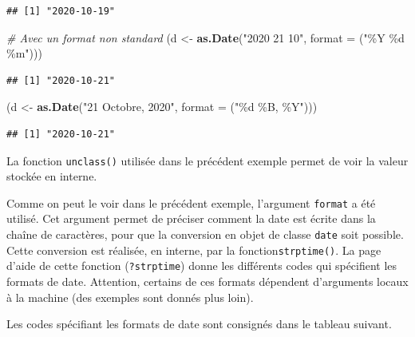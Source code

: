 \documentclass[
  11pt,
]{book}
\newenvironment{Shaded}{\begin{snugshade}}{\end{snugshade}}
\newcommand{\CommentTok}[1]{\textcolor[rgb]{0.56,0.35,0.01}{\textit{#1}}}
\newcommand{\DataTypeTok}[1]{\textcolor[rgb]{0.13,0.29,0.53}{#1}}
\newcommand{\KeywordTok}[1]{\textcolor[rgb]{0.13,0.29,0.53}{\textbf{#1}}}
\newcommand{\NormalTok}[1]{#1}
\newcommand{\StringTok}[1]{\textcolor[rgb]{0.31,0.60,0.02}{#1}}
\numberwithin{equation}{section}
\numberwithin{countremarque}{section}
\begin{document}
\begin{lstlisting}
## [1] "2020-10-19"
\end{lstlisting}

\begin{Shaded}
\begin{Highlighting}[]
\CommentTok{\# Avec un format non standard}
\NormalTok{(d \textless{}{-}}\StringTok{ }\KeywordTok{as.Date}\NormalTok{(}\StringTok{"2020 21 10"}\NormalTok{, }\DataTypeTok{format =}\NormalTok{ (}\StringTok{"\%Y \%d \%m"}\NormalTok{)))}
\end{Highlighting}
\end{Shaded}

\begin{lstlisting}
## [1] "2020-10-21"
\end{lstlisting}

\begin{Shaded}
\begin{Highlighting}[]
\NormalTok{(d \textless{}{-}}\StringTok{ }\KeywordTok{as.Date}\NormalTok{(}\StringTok{"21 Octobre, 2020"}\NormalTok{, }\DataTypeTok{format =}\NormalTok{ (}\StringTok{"\%d \%B, \%Y"}\NormalTok{)))}
\end{Highlighting}
\end{Shaded}

\begin{lstlisting}
## [1] "2020-10-21"
\end{lstlisting}

La fonction \texttt{unclass()} utilisée dans le précédent exemple permet de voir la valeur stockée en interne.

Comme on peut le voir dans le précédent exemple, l'argument \texttt{format} a été utilisé. Cet argument permet de préciser comment la date est écrite dans la chaîne de caractères, pour que la conversion en objet de classe \texttt{date} soit possible. Cette conversion est réalisée, en interne, par la fonction\texttt{strptime()}. La page d'aide de cette fonction (\texttt{?strptime}) donne les différents codes qui spécifient les formats de date. Attention, certains de ces formats dépendent d'arguments locaux à la machine (des exemples sont donnés plus loin).

Les codes spécifiant les formats de date sont consignés dans le tableau suivant.
\end{document}
